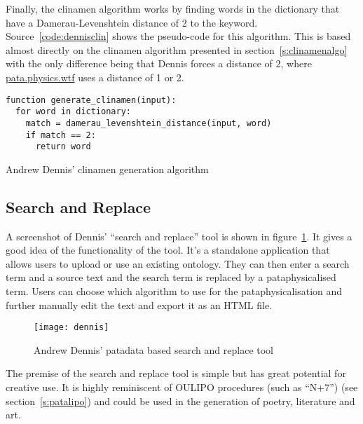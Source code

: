 Finally, the clinamen algorithm works by finding words in the dictionary that have a Damerau-Levenshtein distance of 2 to the keyword. Source~\ref{code:dennisclin} shows the pseudo-code for this algorithm. This is based almost directly on the clinamen algorithm presented in section~\ref{s:clinamenalgo} with the only difference being that Dennis forces a distance of 2, where \url{pata.physics.wtf} uses a distance of 1 or 2.

\begin{listing}[!htbp] %
  \begin{verbatim}
function generate_clinamen(input):
  for word in dictionary:
    match = damerau_levenshtein_distance(input, word)
    if match == 2:
      return word
  \end{verbatim}
\caption[Dennis' clinamen generation]{Andrew Dennis' clinamen generation algorithm}
\label{code:dennisclin}
\end{listing}


\subsection{Search and Replace}

A screenshot of Dennis' ``search and replace'' tool \autocite*{Dennis2016} is shown in figure~\ref{img:dennis}. It gives a good idea of the functionality of the tool. It's a standalone application that allows users to upload or use an existing ontology. They can then enter a search term and a source text and the search term is replaced by a pataphysicalised term. Users can choose which algorithm to use for the pataphysicalisation and further manually edit the text and export it as an \ac{HTML} file.

\begin{figure}[!htbp]
  \centering
  \texttt{[image: dennis]}
\caption[Andrew Dennis' search and replace tool]{Andrew Dennis' patadata based search and replace tool}
\label{img:dennis}
\end{figure}

The premise of the search and replace tool is simple but has great potential for creative use. It is highly reminiscent of \ac{OULIPO} procedures (such as ``N+7'') (see section~\ref{s:patalipo}) and could be used in the generation of poetry, literature and art.

